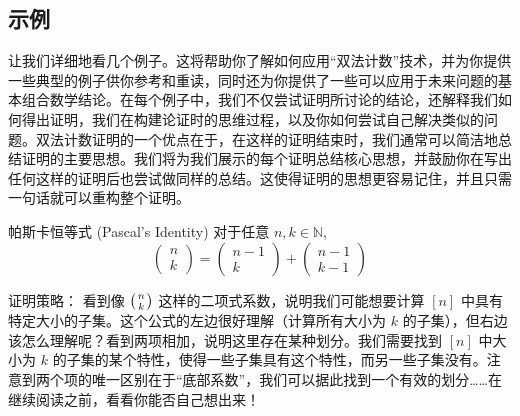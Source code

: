 
\subsection{示例}

让我们详细地看几个例子。这将帮助你了解如何应用``双法计数''技术，并为你提供一些典型的例子供你参考和重读，同时还为你提供了一些可以应用于未来问题的基本组合数学结论。在每个例子中，我们不仅尝试证明所讨论的结论，还解释我们如何得出证明，我们在构建论证时的思维过程，以及你如何尝试自己解决类似的问题。双法计数证明的一个优点在于，在这样的证明结束时，我们通常可以简洁地总结证明的主要思想。我们将为我们展示的每个证明总结核心思想，并鼓励你在写出任何这样的证明后也尝试做同样的总结。这使得证明的思想更容易记住，并且只需一句话就可以重构整个证明。

\begin{proposition}{帕斯卡恒等式 (Pascal's Identity)}
    对于任意 $n,k \in \mathbb{N}$,
    \[\begin{pmatrix}n\\k\end{pmatrix}=\begin{pmatrix}n-1\\k\end{pmatrix}+\begin{pmatrix}n-1\\k-1\end{pmatrix}\]
\end{proposition}

\begin{questions}{证明策略：}
    看到像 $\big({n \atop k}\big)$ 这样的二项式系数，说明我们可能想要计算 $[n]$ 中具有特定大小的子集。这个公式的左边很好理解（计算所有大小为 $k$ 的子集），但右边该怎么理解呢？看到两项相加，说明这里存在某种划分。我们需要找到 $[n]$ 中大小为 $k$ 的子集的某个特性，使得一些子集具有这个特性，而另一些子集没有。注意到两个项的唯一区别在于``底部系数''，我们可以据此找到一个有效的划分……在继续阅读之前，看看你能否自己想出来！
\end{questions}

